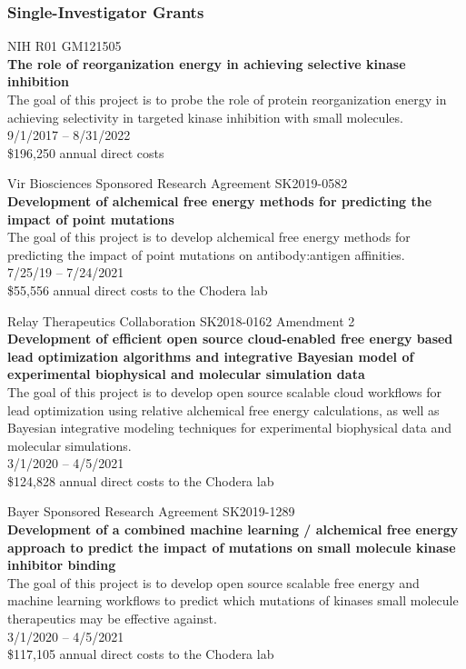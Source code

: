 \documentclass[10pt]{article}
\begin{document}
\subsubsection*{Single-Investigator Grants}


NIH R01 GM121505 \\
{\bf The role of reorganization energy in achieving selective kinase inhibition} \\
The goal of this project is to probe the role of protein reorganization energy in achieving selectivity in targeted kinase inhibition with small molecules. \\
9/1/2017 -- 8/31/2022 \\
\$196,250 annual direct costs

\vspace{1.5ex}

Vir Biosciences Sponsored Research Agreement SK2019-0582 \\
{\bf Development of alchemical free energy methods for predicting the impact of point mutations}\\
The goal of this project is to develop alchemical free energy methods for predicting the impact of point mutations on antibody:antigen affinities.\\
7/25/19 -- 7/24/2021\\
\$55,556 annual direct costs to the Chodera lab

\vspace{1.5ex}

Relay Therapeutics Collaboration SK2018-0162 Amendment 2 \\
{\bf Development of efficient open source cloud-enabled free energy based lead optimization algorithms and integrative Bayesian model of experimental biophysical and molecular simulation data} \\
The goal of this project is to develop open source scalable cloud workflows for lead optimization using relative alchemical free energy calculations, as well as Bayesian integrative modeling techniques for experimental biophysical data and molecular simulations. \\
3/1/2020 -- 4/5/2021 \\
\$124,828 annual direct costs to the Chodera lab

\vspace{1.5ex}

Bayer Sponsored Research Agreement SK2019-1289 \\
{\bf Development of a combined machine learning / alchemical free energy approach to predict the impact of mutations on small molecule kinase inhibitor binding} \\
The goal of this project is to develop open source scalable free energy and machine learning workflows to predict which mutations of kinases small molecule therapeutics may be effective against. \\
3/1/2020 -- 4/5/2021 \\
\$117,105 annual direct costs to the Chodera lab
\end{document}
